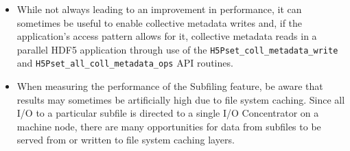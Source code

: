 \documentclass[../main.tex]{subfiles}
\begin{document}
\begin{itemize}
\item While not always leading to an improvement in performance, it can
sometimes be useful to enable collective metadata writes and, if the application's
access pattern allows for it, collective metadata reads in a parallel HDF5
application through use of the \texttt{H5Pset\_coll\_metadata\_write} and
\texttt{H5Pset\_all\_coll\_metadata\_ops} API routines.

\item When measuring the performance of the Subfiling feature, be aware that
results may sometimes be artificially high due to file system caching.
Since all I/O to a particular subfile is directed to a single I/O Concentrator
on a machine node, there are many opportunities for data from subfiles to
be served from or written to file system caching layers.
\end{itemize}
\end{document}

